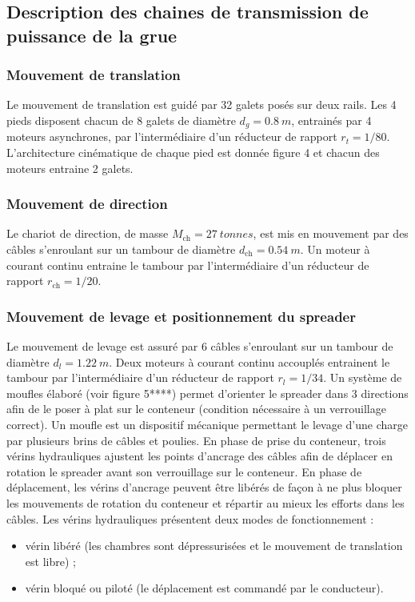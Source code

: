 \documentclass[10pt,fleqn]{article} %
\begin{document}
\subsection{Description des chaines de transmission de puissance de la grue}

\subsubsection{Mouvement de translation}
Le mouvement de translation est guidé par 32 galets posés sur deux rails. Les 4 pieds disposent chacun de
8 galets de diamètre $d_g = \SI{0,8}{m}$, entrainés par 4 moteurs asynchrones, par l’intermédiaire d’un réducteur de
rapport $r_t = 1/80$. L’architecture cinématique de chaque pied est donnée figure 4 et chacun des moteurs entraine 2 galets.

\subsubsection{Mouvement de direction}
Le chariot de direction, de masse $M_{\text{ch}} = \SI{27}{tonnes}$, est mis en mouvement par des câbles s’enroulant sur un
tambour de diamètre $d_{\text{ch}}  = \SI{0,54}{m}$. Un moteur à courant continu entraine le tambour par l’intermédiaire d’un
réducteur de rapport $r_{\text{ch}}  =1/20$.

\subsubsection{Mouvement de levage et positionnement du spreader}
Le mouvement de levage est assuré par 6 câbles s’enroulant sur un tambour de diamètre $d_l = \SI{1,22}{m}$. Deux moteurs
à courant continu accouplés entrainent le tambour par l’intermédiaire d’un réducteur de rapport $r_l = 1/34$.
Un système de moufles élaboré (voir figure 5****) permet d’orienter le spreader dans 3 directions afin de le poser
à plat sur le conteneur (condition nécessaire à un verrouillage correct). Un moufle est un dispositif mécanique
permettant le levage d’une charge par plusieurs brins de câbles et poulies. En phase de prise du conteneur, trois
vérins hydrauliques ajustent les points d’ancrage des câbles afin de déplacer en rotation le spreader avant son
verrouillage sur le conteneur. En phase de déplacement, les vérins d’ancrage peuvent être libérés de façon à ne
plus bloquer les mouvements de rotation du conteneur et répartir au mieux les efforts dans les câbles.
Les vérins hydrauliques présentent deux modes de fonctionnement :
\begin{itemize}
\item vérin libéré (les chambres sont dépressurisées et le mouvement de translation est libre) ;
\item vérin bloqué ou piloté (le déplacement est commandé par le conducteur).
\end{itemize}
\end{document}
